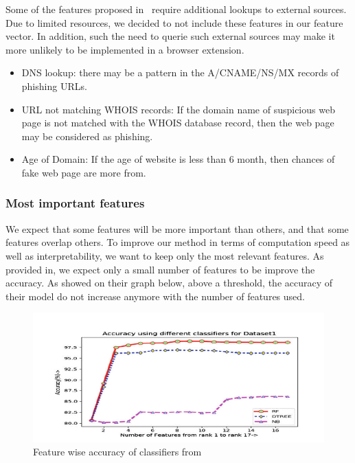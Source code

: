 \documentclass{article}
\begin{document}
    Some of the features proposed in~\cite{PhishSafe} require additional lookups to external sources.
    Due to limited resources, we decided to not include these features in our feature vector.
    In addition, such the need to querie such external sources may make it more unlikely to be implemented in a browser extension.
    \begin{itemize}
        \item DNS lookup: there may be a pattern in the A/CNAME/NS/MX records of phishing URLs.
        \item URL not matching WHOIS records: If the domain name of suspicious web page is not matched with the WHOIS database record, then the web page may be considered as phishing.
        \item Age of Domain: If the age of website is less than 6 month, then chances of fake web page are more from.
    \end{itemize}

    \subsubsection{Most important features}

    We expect that some features will be more important than others, and that some features overlap others.
    To improve our method in terms of computation speed as well as interpretability, we want to keep only the most relevant features.
    As provided in\cite{LexicalFeatureSelection}, we expect only a small number of features to be improve the accuracy.
    As showed on their graph below, above a threshold, the accuracy of their model do not increase anymore with the number of features used.

    \begin{figure}[H]
        \centering
        \includegraphics[width=\textwidth]{report_img/lexicalfeatureselectionaccuracygraph}
        \caption{Feature wise accuracy of classifiers from\cite{LexicalFeatureSelection}}
        \label{fig:}
    \end{figure}
\end{document}
